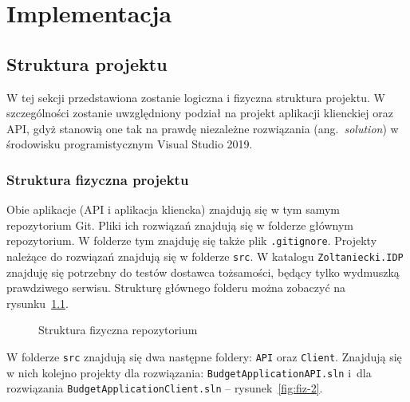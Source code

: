 \chapter{Implementacja}
\label{chap:implementacja}

\section{Struktura projektu}
\label{sec:struktura-projektu}

W tej sekcji przedstawiona zostanie logiczna i fizyczna struktura projektu. W szczególności zostanie uwzględniony podział na projekt aplikacji klienckiej oraz API, gdyż stanowią one tak na prawdę niezależne rozwiązania (ang.~\emph{solution}) w środowisku programistycznym Visual Studio 2019.

\subsection{Struktura fizyczna projektu}
\label{sec:struktura-fizyczna-projektu}

Obie aplikacje (API i aplikacja kliencka) znajdują się w tym samym repozytorium Git. Pliki ich rozwiązań znajdują się w folderze głównym repozytorium. W folderze tym znajduję się także plik \texttt{.gitignore}. Projekty należące do rozwiązań znajdują się w folderze \texttt{src}. W katalogu \texttt{Zoltaniecki.IDP} znajduję się potrzebny do testów dostawca tożsamości, będący tylko wydmuszką prawdziwego serwisu. Strukturę głównego folderu można zobaczyć na rysunku~\ref{fig:fiz-1}.

\begin{figure}[b]
	\centering
	\caption{Struktura fizyczna repozytorium}
	\label{fig:fiz-1}
\end{figure}

W folderze \texttt{src} znajdują się dwa następne foldery: \texttt{API} oraz \texttt{Client}. Znajdują się w nich kolejno projekty dla rozwiązania: \texttt{BudgetApplicationAPI.sln} i~dla rozwiązania \texttt{BudgetApplicationClient.sln} -- rysunek~\ref{fig:fiz-2}. 

